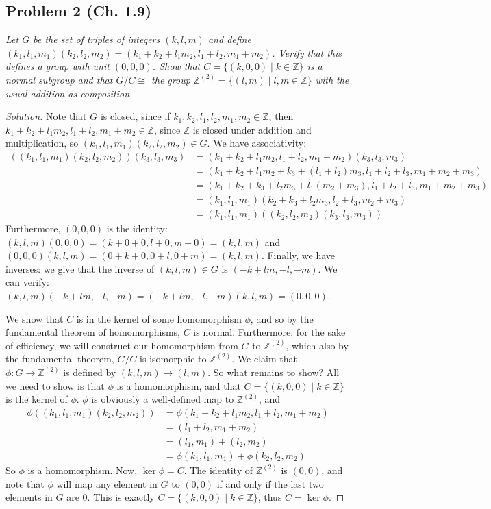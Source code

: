 \documentclass{article}
\newcommand{\Z}{{\mathbb Z}}
\begin{document}
\subsection*{Problem 2 (Ch. 1.9)}
{\it Let $G$ be the set of triples of integers $(k,l,m)$ and define
$(k_1,l_1,m_1)(k_2,l_2,m_2) = (k_1 + k_2 + l_1 m_2, l_1 + l_2, m_1 + m_2)$.
Verify that this defines a group with unit $(0,0,0)$.
Show that $C = \{(k,0,0) \mid k \in \Z\}$ is a normal subgroup
and that $G/C \cong$ the group $\Z^{(2)}=\{(l,m)\mid l,m\in\Z\}$
with the usual addition as composition.}
\begin{proof}[Solution]\let\qed\relax
	Note that $G$ is closed,
	since if $k_1,k_2,l_1,l_2,m_1,m_2 \in \Z$,
	then $k_1 + k_2 + l_1m_2, l_1 + l_2,m_1 + m_2 \in \Z$,
	since $\Z$ is closed under addition and multiplication,
	so $(k_1,l_1,m_1)(k_2,l_2,m_2) \in G$.
	We have associativity:
	\begin{align*}
		((k_1,l_1,m_1)(k_2,l_2,m_2))(k_3,l_3,m_3)
		&= (k_1 + k_2 + l_1m_2, l_1 + l_2, m_1 + m_2)(k_3,l_3,m_3)\\
		&= (k_1 + k_2 + l_1m_2 + k_3 + (l_1 + l_2)m_3, l_1 + l_2 + l_3, m_1 + m_2 + m_3)\\
		&= (k_1 + k_2 + k_3  + l_2m_3 + l_1(m_2 + m_3), l_1 + l_2 + l_3, m_1 + m_2 + m_3)\\
		&= (k_1,l_1,m_1)(k_2 + k_3 + l_2m_3, l_2 + l_3, m_2 + m_3)\\
		&= (k_1, l_1, m_1)((k_2,l_2,m_2)(k_3,l_3,m_3))
	\end{align*}
	Furthermore, $(0,0,0)$ is the identity:
	$(k,l,m)(0,0,0) = (k + 0 + 0, l + 0, m + 0) = (k,l,m)$
	and $(0,0,0)(k,l,m) = (0 + k + 0, 0 + l, 0 + m) = (k,l,m)$.
	Finally, we have inverses:
	we give that the inverse of $(k,l,m) \in G$ is $(-k + lm,-l,-m)$.
	We can verify:
	$(k,l,m)(-k + lm,-l,-m) = (-k + lm,-l,-m)(k,l,m) = (0,0,0)$.

	We show that $C$ is in the kernel of some homomorphism $\phi$,
	and so by the fundamental theorem of homomorphisms,
	$C$ is normal.
	Furthermore, for the sake of efficiency,
	we will construct our homomorphism from $G$ to $\Z^{(2)}$,
	which also by the fundamental theorem,
	$G/C$ is isomorphic to $\Z^{(2)}$.
	We claim that $\phi \colon G \to \Z^{(2)}$ is defined by
	$(k,l,m) \mapsto (l,m)$.
	So what remains to show?
	All we need to show is that $\phi$ is a homomorphism,
	and that $C = \{(k,0,0) \mid k \in \Z\}$ is the kernel of $\phi$.
	$\phi$ is obviously a well-defined map to $\Z^{(2)}$,
	and
	\begin{align*}
		\phi((k_1,l_1,m_1)(k_2,l_2,m_2))
		&= \phi(k_1 + k_2 + l_1m_2, l_1 + l_2, m_1 + m_2)\\
		&= (l_1 + l_2, m_1 + m_2)\\
		&= (l_1,m_1) + (l_2,m_2)\\
		&= \phi(k_1,l_1,m_1) + \phi(k_2,l_2,m_2)
	\end{align*}
	So $\phi$ is a homomorphism.
	Now, $\ker{\phi} = C$.
	The identity of $\Z^{(2)}$ is $(0,0)$,
	and note that $\phi$ will map any element in $G$
	to $(0,0)$ if and only if the last two elements in $G$ are $0$.
	This is exactly $C = \{(k,0,0) \mid k \in \Z\}$,
	thus $C = \ker{\phi}$.
\end{proof}
\end{document}

